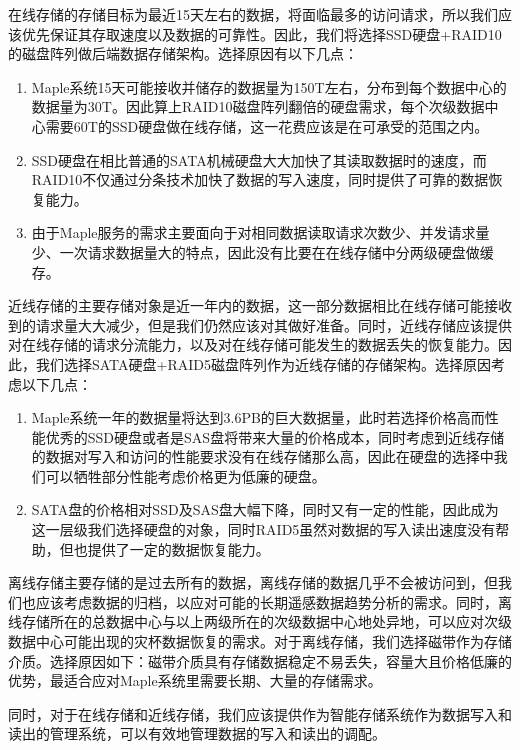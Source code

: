 \documentclass{article}
\begin{document}
在线存储的存储目标为最近15天左右的数据，将面临最多的访问请求，所以我们应该优先保证其存取速度以及数据的可靠性。因此，我们将选择SSD硬盘+RAID10的磁盘阵列做后端数据存储架构。选择原因有以下几点：
\begin{enumerate}
\item Maple系统15天可能接收并储存的数据量为150T左右，分布到每个数据中心的数据量为30T。因此算上RAID10磁盘阵列翻倍的硬盘需求，每个次级数据中心需要60T的SSD硬盘做在线存储，这一花费应该是在可承受的范围之内。

\item SSD硬盘在相比普通的SATA机械硬盘大大加快了其读取数据时的速度，而RAID10不仅通过分条技术加快了数据的写入速度，同时提供了可靠的数据恢复能力。

\item 由于Maple服务的需求主要面向于对相同数据读取请求次数少、并发请求量少、一次请求数据量大的特点，因此没有比要在在线存储中分两级硬盘做缓存。
\end{enumerate}

近线存储的主要存储对象是近一年内的数据，这一部分数据相比在线存储可能接收到的请求量大大减少，但是我们仍然应该对其做好准备。同时，近线存储应该提供对在线存储的请求分流能力，以及对在线存储可能发生的数据丢失的恢复能力。因此，我们选择SATA硬盘+RAID5磁盘阵列作为近线存储的存储架构。选择原因考虑以下几点：
\begin{enumerate}
\item Maple系统一年的数据量将达到3.6PB的巨大数据量，此时若选择价格高而性能优秀的SSD硬盘或者是SAS盘将带来大量的价格成本，同时考虑到近线存储的数据对写入和访问的性能要求没有在线存储那么高，因此在硬盘的选择中我们可以牺牲部分性能考虑价格更为低廉的硬盘。

\item SATA盘的价格相对SSD及SAS盘大幅下降，同时又有一定的性能，因此成为这一层级我们选择硬盘的对象，同时RAID5虽然对数据的写入读出速度没有帮助，但也提供了一定的数据恢复能力。
\end{enumerate}

离线存储主要存储的是过去所有的数据，离线存储的数据几乎不会被访问到，但我们也应该考虑数据的归档，以应对可能的长期遥感数据趋势分析的需求。同时，离线存储所在的总数据中心与以上两级所在的次级数据中心地处异地，可以应对次级数据中心可能出现的灾杯数据恢复的需求。对于离线存储，我们选择磁带作为存储介质。选择原因如下：磁带介质具有存储数据稳定不易丢失，容量大且价格低廉的优势，最适合应对Maple系统里需要长期、大量的存储需求。

同时，对于在线存储和近线存储，我们应该提供作为智能存储系统作为数据写入和读出的管理系统，可以有效地管理数据的写入和读出的调配。
\end{document}
